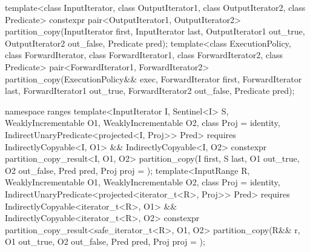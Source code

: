 %
\begin{itemdecl}
template<class InputIterator, class OutputIterator1,
         class OutputIterator2, class Predicate>
  constexpr pair<OutputIterator1, OutputIterator2>
    partition_copy(InputIterator first, InputIterator last,
                   OutputIterator1 out_true, OutputIterator2 out_false, Predicate pred);
template<class ExecutionPolicy, class ForwardIterator, class ForwardIterator1,
         class ForwardIterator2, class Predicate>
  pair<ForwardIterator1, ForwardIterator2>
    partition_copy(ExecutionPolicy&& exec,
                   ForwardIterator first, ForwardIterator last,
                   ForwardIterator1 out_true, ForwardIterator2 out_false, Predicate pred);

namespace ranges {
  template<InputIterator I, Sentinel<I> S, WeaklyIncrementable O1, WeaklyIncrementable O2,
           class Proj = identity, IndirectUnaryPredicate<projected<I, Proj>> Pred>
    requires IndirectlyCopyable<I, O1> && IndirectlyCopyable<I, O2>
    constexpr partition_copy_result<I, O1, O2>
      partition_copy(I first, S last, O1 out_true, O2 out_false, Pred pred,
                     Proj proj = {});
  template<InputRange R, WeaklyIncrementable O1, WeaklyIncrementable O2,
           class Proj = identity,
           IndirectUnaryPredicate<projected<iterator_t<R>, Proj>> Pred>
    requires IndirectlyCopyable<iterator_t<R>, O1> &&
             IndirectlyCopyable<iterator_t<R>, O2>
    constexpr partition_copy_result<safe_iterator_t<R>, O1, O2>
      partition_copy(R&& r, O1 out_true, O2 out_false, Pred pred, Proj proj = {});
}
\end{itemdecl}

